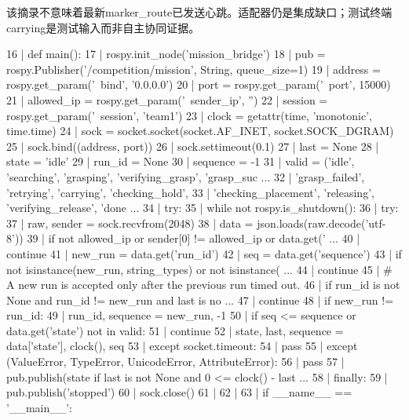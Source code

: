 该摘录不意味着最新marker\_route已发送心跳。适配器仍是集成缺口；测试终端carrying是测试输入而非自主协同证据。
\begin{CodeBlock}
  16 | def main():
  17 |     rospy.init_node('mission_bridge')
  18 |     pub = rospy.Publisher('/competition/mission', String, queue_size=1)
  19 |     address = rospy.get_param('~bind', '0.0.0.0')
  20 |     port = rospy.get_param('~port', 15000)
  21 |     allowed_ip = rospy.get_param('~sender_ip', '')
  22 |     session = rospy.get_param('~session', 'team1')
  23 |     clock = getattr(time, 'monotonic', time.time)
  24 |     sock = socket.socket(socket.AF_INET, socket.SOCK_DGRAM)
  25 |     sock.bind((address, port))
  26 |     sock.settimeout(0.1)
  27 |     last = None
  28 |     state = 'idle'
  29 |     run_id = None
  30 |     sequence = -1
  31 |     valid = ('idle', 'searching', 'grasping', 'verifying_grasp', 'grasp_suc ...
  32 |              'grasp_failed', 'retrying', 'carrying', 'checking_hold',
  33 |              'checking_placement', 'releasing', 'verifying_release', 'done  ...
  34 |     try:
  35 |         while not rospy.is_shutdown():
  36 |             try:
  37 |                 raw, sender = sock.recvfrom(2048)
  38 |                 data = json.loads(raw.decode('utf-8'))
  39 |                 if not allowed_ip or sender[0] != allowed_ip or data.get('  ...
  40 |                     continue
  41 |                 new_run = data.get('run_id')
  42 |                 seq = data.get('sequence')
  43 |                 if not isinstance(new_run, string_types) or not isinstance( ...
  44 |                     continue
  45 |                 # A new run is accepted only after the previous run timed out.
  46 |                 if run_id is not None and run_id != new_run and last is no  ...
  47 |                     continue
  48 |                 if new_run != run_id:
  49 |                     run_id, sequence = new_run, -1
  50 |                 if seq <= sequence or data.get('state') not in valid:
  51 |                     continue
  52 |                 state, last, sequence = data['state'], clock(), seq
  53 |             except socket.timeout:
  54 |                 pass
  55 |             except (ValueError, TypeError, UnicodeError, AttributeError):
  56 |                 pass
  57 |             pub.publish(state if last is not None and 0 <= clock() - last   ...
  58 |     finally:
  59 |         pub.publish('stopped')
  60 |         sock.close()
  61 | 
  62 | 
  63 | if __name__ == '__main__':
\end{CodeBlock}
